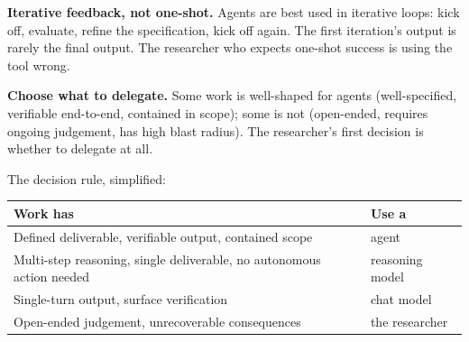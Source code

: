 \documentclass[
  letterpaper,
  11pt]{scrbook}
\newcounter{none} %
\begin{document}
\textbf{Iterative feedback, not one-shot.} Agents are best used in
iterative loops: kick off, evaluate, refine the specification, kick off
again. The first iteration's output is rarely the final output. The
researcher who expects one-shot success is using the tool wrong.

\textbf{Choose what to delegate.} Some work is well-shaped for agents
(well-specified, verifiable end-to-end, contained in scope); some is not
(open-ended, requires ongoing judgement, has high blast radius). The
researcher's first decision is whether to delegate at all.

The decision rule, simplified:

{\def\LTcaptype{none} %
\begin{longtable}[]{@{}
  >{\raggedright\arraybackslash}p{}
  >{\raggedright\arraybackslash}p{}@{}}
\toprule\noalign{}
\begin{minipage}[b]{\linewidth}\raggedright
Work has
\end{minipage} & \begin{minipage}[b]{\linewidth}\raggedright
Use a
\end{minipage} \\
\midrule\noalign{}
\endhead
\bottomrule\noalign{}
\endlastfoot
Defined deliverable, verifiable output, contained scope & agent \\
Multi-step reasoning, single deliverable, no autonomous action needed &
reasoning model \\
Single-turn output, surface verification & chat model \\
Open-ended judgement, unrecoverable consequences & the researcher \\
\end{longtable}
}
\end{document}
